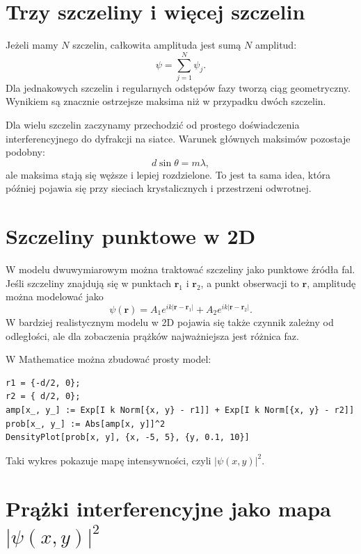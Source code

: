 \section{Trzy szczeliny i więcej szczelin}

Jeżeli mamy \(N\) szczelin, całkowita amplituda jest sumą \(N\) amplitud:
\begin{equation}
    \psi=\sum_{j=1}^N \psi_j.
\end{equation}
Dla jednakowych szczelin i regularnych odstępów fazy tworzą ciąg geometryczny. Wynikiem są znacznie ostrzejsze maksima niż w przypadku dwóch szczelin.

Dla wielu szczelin zaczynamy przechodzić od prostego doświadczenia interferencyjnego do dyfrakcji na siatce. Warunek głównych maksimów pozostaje podobny:
\begin{equation}
    d\sin\theta=m\lambda,
\end{equation}
ale maksima stają się węższe i lepiej rozdzielone. To jest ta sama idea, która później pojawia się przy sieciach krystalicznych i przestrzeni odwrotnej.

\section{Szczeliny punktowe w 2D}

W modelu dwuwymiarowym można traktować szczeliny jako punktowe źródła fal. Jeśli szczeliny znajdują się w punktach \(\mathbf{r}_1\) i \(\mathbf{r}_2\), a punkt obserwacji to \(\mathbf{r}\), amplitudę można modelować jako
\begin{equation}
    \psi(\mathbf{r})=A_1e^{ik|\mathbf{r}-\mathbf{r}_1|}+A_2e^{ik|\mathbf{r}-\mathbf{r}_2|}.
\end{equation}
W bardziej realistycznym modelu w 2D pojawia się także czynnik zależny od odległości, ale dla zobaczenia prążków najważniejsza jest różnica faz.

W Mathematice można zbudować prosty model:
\begin{verbatim}
r1 = {-d/2, 0};
r2 = { d/2, 0};
amp[x_, y_] := Exp[I k Norm[{x, y} - r1]] + Exp[I k Norm[{x, y} - r2]]
prob[x_, y_] := Abs[amp[x, y]]^2
DensityPlot[prob[x, y], {x, -5, 5}, {y, 0.1, 10}]
\end{verbatim}
Taki wykres pokazuje mapę intensywności, czyli \(|\psi(x,y)|^2\).

\section{Prążki interferencyjne jako mapa \texorpdfstring{\(|\psi(x,y)|^2\)}{|psi(x,y)|^2}}

